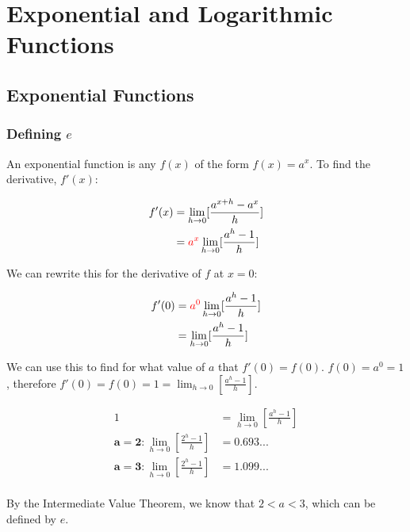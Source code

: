 \documentclass[12pt]{article}
\begin{document}
\section{Exponential and Logarithmic Functions}
\subsection{Exponential Functions}
\subsubsection{Defining \texorpdfstring{$e$}{TEXT}}

An exponential function is any $f(x)$ of the form $f(x) = a^x$. To find the derivative, $f'(x)$:

\begin{equation}
    \begin{split}
        f'(x) &= \lim_{h\to 0} [\frac{a^{x+h}-a^x}{h}]\\
        &=\textcolor{red}{a^x}\lim_{h\to 0}[\frac{a^h-1}{h}]\\
    \end{split}
\end{equation}

We can rewrite this for the derivative of $f$ at $x = 0$:

\begin{equation}\label{eqn:expderiv}
    \begin{split}
    f'(0) &= \textcolor{red}{a^0}\lim_{h\to 0}[\frac{a^h-1}{h}]\\
    &=\lim_{h\to 0}[\frac{a^h-1}{h}]
    \end{split}
\end{equation}

We can use this to find for what value of $a$ that $f'(0) = f(0)$. $f(0) = a^0 = 1$, therefore $f'(0) = f(0) = 1 = \lim_{h\to 0}[\frac{a^h-1}{h}]$.

\begin{equation}
    \begin{split}
        1 &= \lim_{h\to 0}[\frac{a^h-1}{h}]\\
        \mathbf{a = 2:} \lim_{h\to 0}[\frac{2^h-1}{h}] &= 0.693...\\
        \mathbf{a = 3:} \lim_{h\to 0}[\frac{2^h-1}{h}] &= 1.099...\\
    \end{split}
\end{equation}

By the Intermediate Value Theorem, we know that $2 < a < 3$, which can be defined by $e$.
\end{document}
